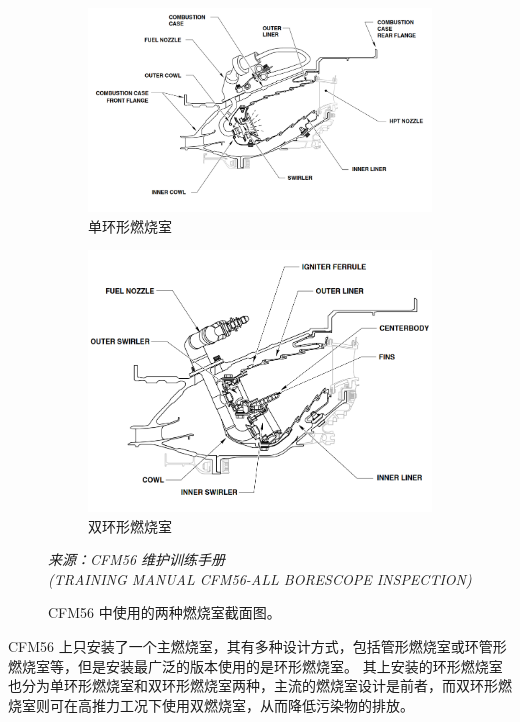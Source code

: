 \begin{figure}[!ht]
    \centering
    \begin{subfigure}{0.5\linewidth}
        \includegraphics[width=\linewidth]{combustor-1.png}
        \caption{单环形燃烧室}
    \end{subfigure}
    \hfil
    \begin{subfigure}{0.45\linewidth}
        \includegraphics[width=\linewidth]{combustor-2.png}
        \caption{双环形燃烧室}
    \end{subfigure}
    \caption[CFM56 中使用的两种燃烧室截面图。]{CFM56 中使用的两种燃烧室截面图。}
    \label{fig:part-3-combustor}
    \textit{\small 来源：CFM56 维护训练手册 \\ (TRAINING MANUAL CFM56-ALL BORESCOPE INSPECTION)}
\end{figure}

CFM56 上只安装了一个主燃烧室，其有多种设计方式，包括管形燃烧室或环管形燃烧室等，但是安装最广泛的版本使用的是环形燃烧室。
其上安装的环形燃烧室也分为单环形燃烧室和双环形燃烧室两种，主流的燃烧室设计是前者，而双环形燃烧室则可在高推力工况下使用双燃烧室，从而降低污染物的排放。

